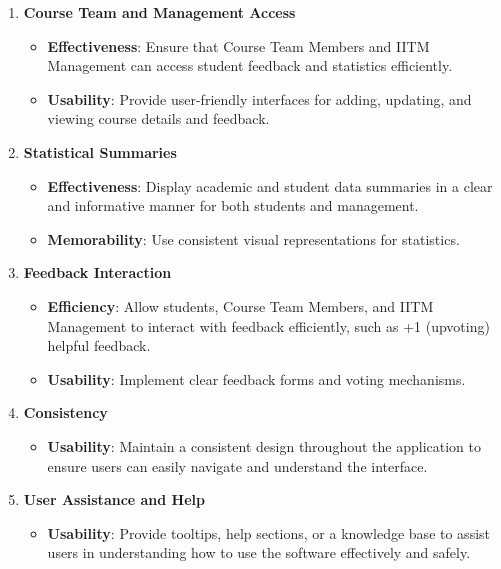 \begin{enumerate}
\item \textbf{Course Team and Management Access}
    \begin{itemize}
        \tightlist
        \item \textbf{Effectiveness}: Ensure that Course Team Members and IITM Management can access student feedback and statistics efficiently.
        \item \textbf{Usability}: Provide user-friendly interfaces for adding, updating, and viewing course details and feedback.
    \end{itemize}


\item \textbf{Statistical Summaries}
    \begin{itemize}
        \tightlist
        \item \textbf{Effectiveness}: Display academic and student data summaries in a clear and informative manner for both students and management.
        \item \textbf{Memorability}: Use consistent visual representations for statistics.
    \end{itemize}


\item \textbf{Feedback Interaction}
    \begin{itemize}
        \tightlist
        \item \textbf{Efficiency}: Allow students, Course Team Members, and IITM Management to interact with feedback efficiently, such as +1 (upvoting) helpful feedback.
        \item \textbf{Usability}: Implement clear feedback forms and voting mechanisms.
    \end{itemize}

\item \textbf{Consistency}
    \begin{itemize}
        \tightlist
        \item \textbf{Usability}: Maintain a consistent design throughout the application to ensure users can easily navigate and understand the interface.
    \end{itemize}

\item \textbf{User Assistance and Help}
    \begin{itemize}
        \tightlist
        \item \textbf{Usability}: Provide tooltips, help sections, or a knowledge base to assist users in understanding how to use the software effectively and safely.
    \end{itemize}



\end{enumerate}
